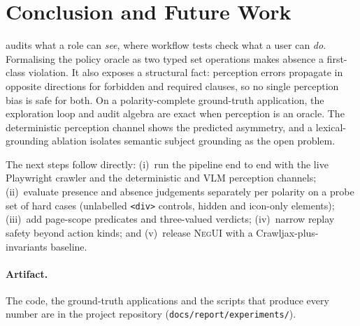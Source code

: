 \section{Conclusion and Future Work}
\label{sec:conclusion}

\sys{} audits what a role can \emph{see}, where workflow tests check what a
user can \emph{do}. Formalising the policy oracle as two typed set operations
makes absence a first-class violation. It also exposes a structural fact:
perception errors propagate in opposite directions for forbidden and required
clauses, so no single perception bias is safe for both. On a polarity-complete
ground-truth application, the exploration loop and audit algebra are exact
when perception is an oracle. The deterministic perception channel shows the
predicted asymmetry, and a lexical-grounding ablation isolates semantic
subject grounding as the open problem.

The next steps follow directly:
(i)~run the pipeline end to end with the live Playwright crawler and the
deterministic and VLM perception channels;
(ii)~evaluate presence and absence judgements separately per polarity on a
probe set of hard cases (unlabelled \texttt{<div>} controls, hidden and
icon-only elements);
(iii)~add page-scope predicates and three-valued verdicts;
(iv)~narrow replay safety beyond action kinds; and
(v)~release \textsc{NegUI} with a Crawljax-plus-invariants baseline.

\paragraph{Artifact.}
The code, the ground-truth applications and the scripts that produce every number are in the project repository (\nolinkurl{docs/report/experiments/}).
